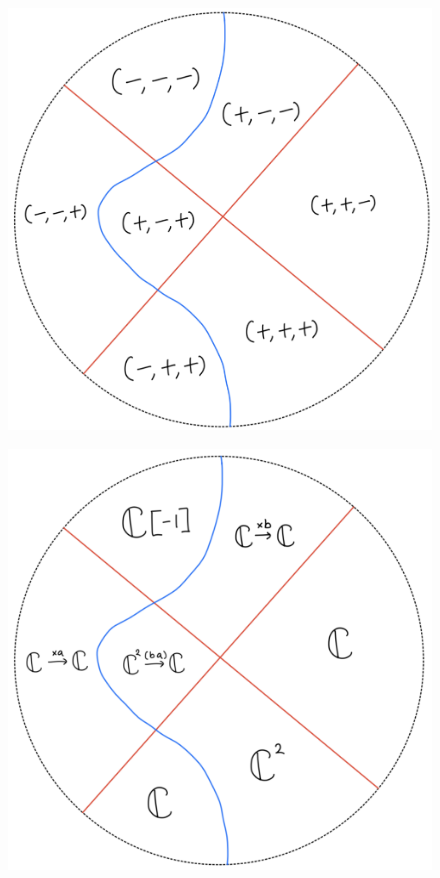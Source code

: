 \begin{figure}[H]
    \centering
    \includegraphics[scale = 0.45]{diagrams/lemma4/26.png}
    \caption{}
    \label{fig:your-label}
\end{figure}
\begin{figure}[H]
    \centering
    \includegraphics[scale = 0.45]{diagrams/lemma4/27.png}
    \caption{}
    \label{fig:your-label}
\end{figure}
